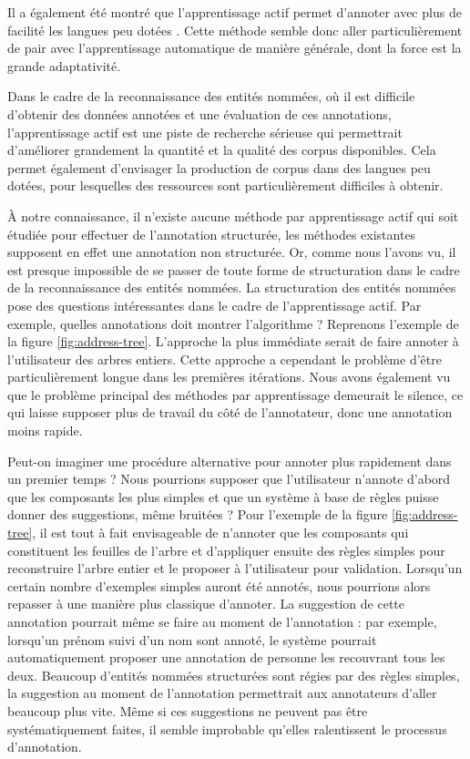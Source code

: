 \documentclass[PhD-Yoann-Dupont.tex]{subfiles}
\begin{document}
Il a également été montré que l'apprentissage actif permet d'annoter avec plus de facilité les langues peu dotées \citep{garrette2013real}. Cette méthode semble donc aller particulièrement de pair avec l'apprentissage automatique de manière générale, dont la force est la grande adaptativité.

Dans le cadre de la reconnaissance des entités nommées, où il est difficile d'obtenir des données annotées et une évaluation de ces annotations, l'apprentissage actif est une piste de recherche sérieuse qui permettrait d'améliorer grandement la quantité et la qualité des corpus disponibles. Cela permet également d'envisager la production de corpus dans des langues peu dotées, pour lesquelles des ressources sont particulièrement difficiles à obtenir.

À notre connaissance, il n'existe aucune méthode par apprentissage actif qui soit étudiée pour effectuer de l'annotation structurée, les méthodes existantes supposent en effet une annotation non structurée. Or, comme nous l'avons vu, il est presque impossible de se passer de toute forme de structuration dans le cadre de la reconnaissance des entités nommées. La structuration des entités nommées pose des questions intéressantes dans le cadre de l'apprentissage actif. Par exemple, quelles annotations doit montrer l'algorithme ? Reprenons l'exemple de la figure \ref{fig:address-tree}. L'approche la plus immédiate serait de faire annoter à l'utilisateur des arbres entiers. Cette approche a cependant le problème d'être particulièrement longue dans les premières itérations. Nous avons également vu que le problème principal des méthodes par apprentissage demeurait le silence, ce qui laisse supposer plus de travail du côté de l'annotateur, donc une annotation moins rapide.

Peut-on imaginer une procédure alternative pour annoter plus rapidement dans un premier temps ? Nous pourrions supposer que l'utilisateur n'annote d'abord que les composants les plus simples et que un système à base de règles puisse donner des suggestions, même bruitées ? Pour l'exemple de la figure \ref{fig:address-tree}, il est tout à fait envisageable de n'annoter que les composants qui constituent les feuilles de l'arbre et d'appliquer ensuite des règles simples pour reconstruire l'arbre entier et le proposer à l'utilisateur pour validation. Lorsqu'un certain nombre d'exemples simples auront été annotés, nous pourrions alors repasser à une manière plus classique d'annoter. La suggestion de cette annotation pourrait même se faire au moment de l'annotation : par exemple, lorsqu'un prénom suivi d'un nom sont annoté, le système pourrait automatiquement proposer une annotation de personne les recouvrant tous les deux. Beaucoup d'entités nommées structurées sont régies par des règles simples, la suggestion au moment de l'annotation permettrait aux annotateurs d'aller beaucoup plus vite. Même si ces suggestions ne peuvent pas être systématiquement faites, il semble improbable qu'elles ralentissent le processus d'annotation.
\end{document}

